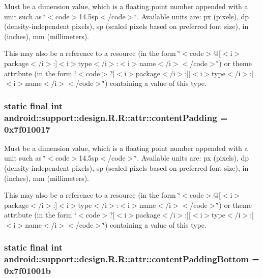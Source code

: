 Must be a dimension value, which is a floating point number appended with a unit such as \char`\"{}$<$code$>$14.5sp$<$/code$>$\char`\"{}. Available units are: px (pixels), dp (density-independent pixels), sp (scaled pixels based on preferred font size), in (inches), mm (millimeters). 

This may also be a reference to a resource (in the form \char`\"{}$<$code$>$@\mbox{[}$<$i$>$package$<$/i$>$:\mbox{]}$<$i$>$type$<$/i$>$:$<$i$>$name$<$/i$>$$<$/code$>$\char`\"{}) or theme attribute (in the form \char`\"{}$<$code$>$?\mbox{[}$<$i$>$package$<$/i$>$:\mbox{]}\mbox{[}$<$i$>$type$<$/i$>$:\mbox{]}$<$i$>$name$<$/i$>$$<$/code$>$\char`\"{}) containing a value of this type. \hypertarget{classandroid_1_1support_1_1design_1_1_r_1_1attr_315ee5a6703b5ff2988dbc790f01f535}{
\subsubsection[{contentPadding}]{\setlength{\rightskip}{0pt plus 5cm}static final int android::support::design.R.R::attr::contentPadding = 0x7f010017}}
\label{classandroid_1_1support_1_1design_1_1_r_1_1attr_315ee5a6703b5ff2988dbc790f01f535}


Must be a dimension value, which is a floating point number appended with a unit such as \char`\"{}$<$code$>$14.5sp$<$/code$>$\char`\"{}. Available units are: px (pixels), dp (density-independent pixels), sp (scaled pixels based on preferred font size), in (inches), mm (millimeters). 

This may also be a reference to a resource (in the form \char`\"{}$<$code$>$@\mbox{[}$<$i$>$package$<$/i$>$:\mbox{]}$<$i$>$type$<$/i$>$:$<$i$>$name$<$/i$>$$<$/code$>$\char`\"{}) or theme attribute (in the form \char`\"{}$<$code$>$?\mbox{[}$<$i$>$package$<$/i$>$:\mbox{]}\mbox{[}$<$i$>$type$<$/i$>$:\mbox{]}$<$i$>$name$<$/i$>$$<$/code$>$\char`\"{}) containing a value of this type. \hypertarget{classandroid_1_1support_1_1design_1_1_r_1_1attr_4f00fd7091c3b620d621bd872308f6a0}{
\subsubsection[{contentPaddingBottom}]{\setlength{\rightskip}{0pt plus 5cm}static final int android::support::design.R.R::attr::contentPaddingBottom = 0x7f01001b}}
\label{classandroid_1_1support_1_1design_1_1_r_1_1attr_4f00fd7091c3b620d621bd872308f6a0}


